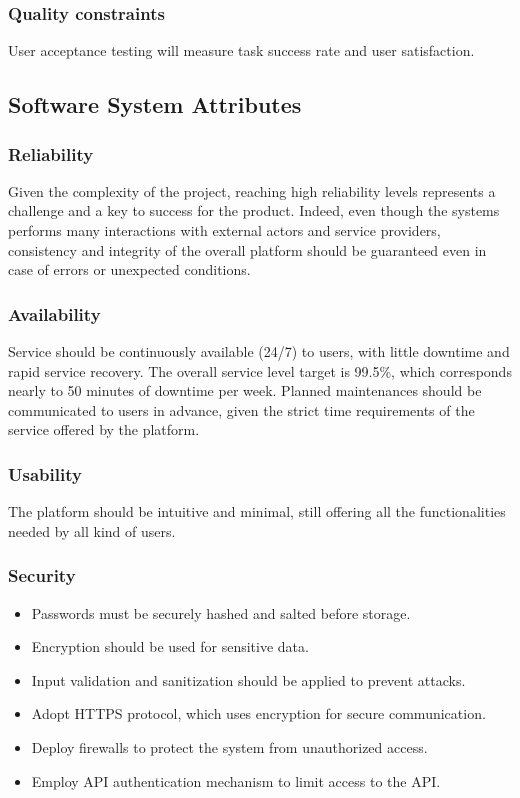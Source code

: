 \subsubsection{Quality constraints}
User acceptance testing will measure task success rate and user satisfaction.

\subsection{Software System Attributes}
\subsubsection{Reliability}
Given the complexity of the project, reaching high reliability levels represents a challenge and a key to success for the product. Indeed, even though the systems performs many interactions with external actors and service providers, consistency and integrity of the overall platform should be guaranteed even in case of errors or unexpected conditions.
\subsubsection{Availability}
Service should be continuously available (24/7) to users, with little downtime and rapid service recovery. The overall service level target is 99.5\%, which corresponds nearly to 50 minutes of downtime per week. Planned maintenances should be communicated to users in advance, given the strict time requirements of the service offered by the platform.
\subsubsection{Usability}
The platform should be intuitive and minimal, still offering all the functionalities needed by all kind of users.
\subsubsection{Security}
\begin{itemize}
    \item Passwords must be securely hashed and salted before storage.
    \item Encryption should be used for sensitive data.
    \item Input validation and sanitization should be applied to prevent attacks.
    \item Adopt HTTPS protocol, which uses encryption for secure communication.
    \item Deploy firewalls to protect the system from unauthorized access.
    \item Employ API authentication mechanism to limit access to the API.
\end{itemize}

